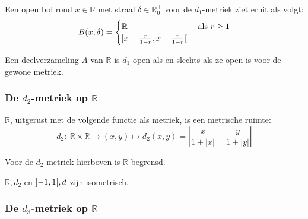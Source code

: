 \documentclass[main.tex]{subfiles}
\begin{document}
\begin{vb}
  Een open bol rond $x\in \mathbb{R}$ met straal $\delta\in \mathbb{R}_{0}^{+}$ voor de $d_{1}$-metriek ziet eruit als volgt:
  \[ B(x,\delta) = 
  \begin{cases}
    \mathbb{R} &\text{ als } r \ge 1\\
    \interval[open]{x-\frac{r}{1-r}}{x+\frac{r}{1-r}}
  \end{cases}
  \]
\end{vb}

\begin{st}
  Een deelverzameling $A$ van $\mathbb{R}$ is $d_{1}$-open als en slechts als ze open is voor de gewone metriek.
\end{st}

\subsubsection{De $d_2$-metriek op $\mathbb{R}$}
\label{sec:d_2-metriek-op}

\begin{vb}
  $\mathbb{R}$, uitgerust met de volgende functie als metriek, is een metrische ruimte:
  \[ d_{2}:\ \mathbb{R}\times\mathbb{R}\rightarrow (x,y) \mapsto d_{2}(x,y)=\left| \frac{x}{1+|x|} - \frac{y}{1+|y|} \right| \]
\end{vb}

\begin{st}
  Voor de $d_{2}$ metriek hierboven is $\mathbb{R}$ begrensd.
\end{st}



\begin{vb}
  $\mathbb{R},d_{2}$ en $\interval[open]{-1}{1},d$ zijn isometrisch.
\end{vb}

\subsubsection{De $d_3$-metriek op $\mathbb{R}$}
\label{sec:d_3-metriek-op}
\end{document}
